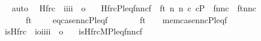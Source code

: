 \begin{isabellebody}
\ \ \isamarkupfalse%
\ auto%
\endisatagproof
{\isafoldproof}%
%
\isadelimproof
\isanewline
%
\endisadelimproof
\isanewline
{}\isamarkupfalse%
\isanewline
\ \ Hfrc\ {\isacharcolon}{\kern0pt}{\isacharcolon}{\kern0pt}\ {\isachardoublequoteopen}{\isacharbrackleft}{\kern0pt}i{\isacharcomma}{\kern0pt}i{\isacharcomma}{\kern0pt}i{\isacharcomma}{\kern0pt}i{\isacharbrackright}{\kern0pt}\ {\isasymRightarrow}\ o{\isachardoublequoteclose}\ \isanewline
\ \ {\isachardoublequoteopen}Hfrc{\isacharparenleft}{\kern0pt}P{\isacharcomma}{\kern0pt}leq{\isacharcomma}{\kern0pt}fnnc{\isacharcomma}{\kern0pt}f{\isacharparenright}{\kern0pt}\ {\isasymequiv}\ {\isasymexists}ft{\isachardot}{\kern0pt}\ {\isasymexists}n{}{\isachardot}{\kern0pt}\ {\isasymexists}n{}{\isachardot}{\kern0pt}\ {\isasymexists}c{\isachardot}{\kern0pt}\ c{\isasymin}P\ {\isasymand}\ fnnc\ {\isacharequal}{\kern0pt}\ {\isasymlangle}ft{\isacharcomma}{\kern0pt}n{}{\isacharcomma}{\kern0pt}n{}{\isacharcomma}{\kern0pt}c{\isasymrangle}\ {\isasymand}\isanewline
\ \ \ \ \ {\isacharparenleft}{\kern0pt}\ \ ft\ {\isacharequal}{\kern0pt}\ {}\ {\isasymand}\ \ eq{\isacharunderscore}{\kern0pt}case{\isacharparenleft}{\kern0pt}n{}{\isacharcomma}{\kern0pt}n{}{\isacharcomma}{\kern0pt}c{\isacharcomma}{\kern0pt}P{\isacharcomma}{\kern0pt}leq{\isacharcomma}{\kern0pt}f{\isacharparenright}{\kern0pt}\isanewline
\ \ \ \ \ \ {\isasymor}\ ft\ {\isacharequal}{\kern0pt}\ {}\ {\isasymand}\ mem{\isacharunderscore}{\kern0pt}case{\isacharparenleft}{\kern0pt}n{}{\isacharcomma}{\kern0pt}n{}{\isacharcomma}{\kern0pt}c{\isacharcomma}{\kern0pt}P{\isacharcomma}{\kern0pt}leq{\isacharcomma}{\kern0pt}f{\isacharparenright}{\kern0pt}{\isacharparenright}{\kern0pt}{\isachardoublequoteclose}\isanewline
\isanewline
{}\isamarkupfalse%
\isanewline
\ \ is{\isacharunderscore}{\kern0pt}Hfrc\ {\isacharcolon}{\kern0pt}{\isacharcolon}{\kern0pt}\ {\isachardoublequoteopen}{\isacharbrackleft}{\kern0pt}i{\isasymRightarrow}o{\isacharcomma}{\kern0pt}i{\isacharcomma}{\kern0pt}i{\isacharcomma}{\kern0pt}i{\isacharcomma}{\kern0pt}i{\isacharbrackright}{\kern0pt}\ {\isasymRightarrow}\ o{\isachardoublequoteclose}\ \isanewline
\ \ {\isachardoublequoteopen}is{\isacharunderscore}{\kern0pt}Hfrc{\isacharparenleft}{\kern0pt}M{\isacharcomma}{\kern0pt}P{\isacharcomma}{\kern0pt}leq{\isacharcomma}{\kern0pt}fnnc{\isacharcomma}{\kern0pt}f{\isacharparenright}{\kern0pt}\ {\isasymequiv}\isanewline

\end{isabellebody}
